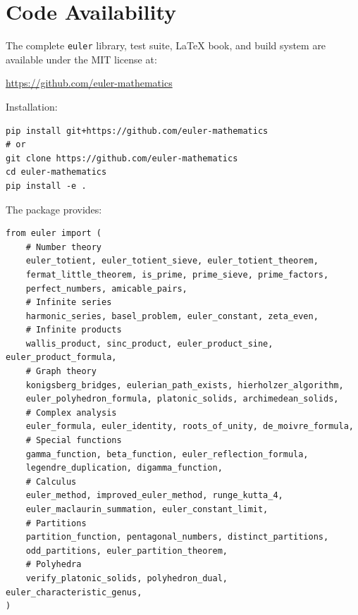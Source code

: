 \documentclass[11pt,a4paper]{article}
\theoremstyle{definition}
\begin{document}
\appendix
\section{Code Availability}
\label{app:availability}

The complete \texttt{euler} library, test suite, LaTeX book, and build system are available under the MIT license at:

\begin{center}
\url{https://github.com/euler-mathematics}
\end{center}

Installation:
\begin{verbatim}
pip install git+https://github.com/euler-mathematics
# or
git clone https://github.com/euler-mathematics
cd euler-mathematics
pip install -e .
\end{verbatim}

The package provides:
\begin{verbatim}
from euler import (
    # Number theory
    euler_totient, euler_totient_sieve, euler_totient_theorem,
    fermat_little_theorem, is_prime, prime_sieve, prime_factors,
    perfect_numbers, amicable_pairs,
    # Infinite series
    harmonic_series, basel_problem, euler_constant, zeta_even,
    # Infinite products
    wallis_product, sinc_product, euler_product_sine, euler_product_formula,
    # Graph theory
    konigsberg_bridges, eulerian_path_exists, hierholzer_algorithm,
    euler_polyhedron_formula, platonic_solids, archimedean_solids,
    # Complex analysis
    euler_formula, euler_identity, roots_of_unity, de_moivre_formula,
    # Special functions
    gamma_function, beta_function, euler_reflection_formula,
    legendre_duplication, digamma_function,
    # Calculus
    euler_method, improved_euler_method, runge_kutta_4,
    euler_maclaurin_summation, euler_constant_limit,
    # Partitions
    partition_function, pentagonal_numbers, distinct_partitions,
    odd_partitions, euler_partition_theorem,
    # Polyhedra
    verify_platonic_solids, polyhedron_dual, euler_characteristic_genus,
)
\end{verbatim}
\end{document}
